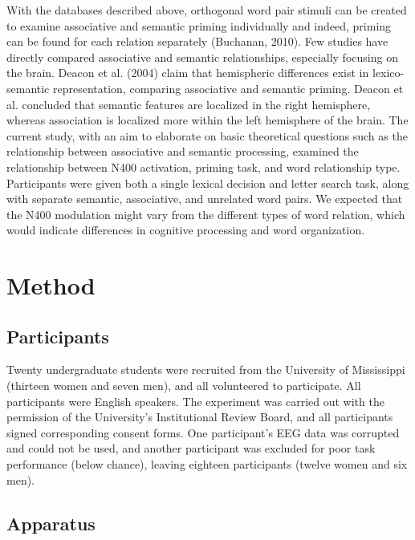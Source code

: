 \documentclass[english,man]{apa6}
\theoremstyle{definition}
\theoremstyle{definition}
\theoremstyle{definition}
\theoremstyle{remark}
\begin{document}
With the databases described above, orthogonal word pair stimuli can be
created to examine associative and semantic priming individually and
indeed, priming can be found for each relation separately (Buchanan,
2010). Few studies have directly compared associative and semantic
relationships, especially focusing on the brain. Deacon et al. (2004)
claim that hemispheric differences exist in lexico-semantic
representation, comparing associative and semantic priming. Deacon et
al. concluded that semantic features are localized in the right
hemisphere, whereas association is localized more within the left
hemisphere of the brain. The current study, with an aim to elaborate on
basic theoretical questions such as the relationship between associative
and semantic processing, examined the relationship between N400
activation, priming task, and word relationship type. Participants were
given both a single lexical decision and letter search task, along with
separate semantic, associative, and unrelated word pairs. We expected
that the N400 modulation might vary from the different types of word
relation, which would indicate differences in cognitive processing and
word organization.

\section{Method}\label{method}

\subsection{Participants}\label{participants}

Twenty undergraduate students were recruited from the University of
Mississippi (thirteen women and seven men), and all volunteered to
participate. All participants were English speakers. The experiment was
carried out with the permission of the University's Institutional Review
Board, and all participants signed corresponding consent forms. One
participant's EEG data was corrupted and could not be used, and another
participant was excluded for poor task performance (below chance),
leaving eighteen participants (twelve women and six men).

\subsection{Apparatus}\label{apparatus}
\end{document}
